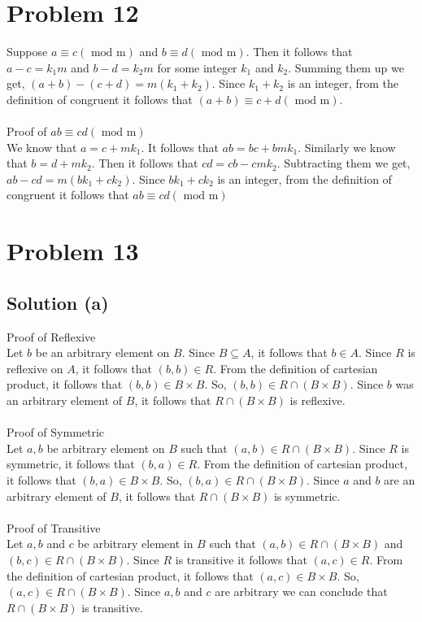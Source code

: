 \documentclass{article}
\begin{document}
\section{Problem 12}
Suppose $a \equiv c (\text{ mod m})$ and $b \equiv d (\text{ mod m})$. Then it follows
that $a - c = k_1m$ and $b - d = k_2m$ for some integer $k_1$ and
$k_2$. Summing them up we get, $(a + b) - (c + d) = m(k_1 + k_2)$.
Since $k_1 + k_2$ is an integer, from the definition of congruent it
follows that $(a + b) \equiv c + d (\text{ mod m})$. \\ \\
Proof of $ab \equiv cd (\text{ mod m})$ \\
We know that $ a = c + mk_1$. It follows that $ab = bc + bmk_1$.
Similarly we know that $b = d + mk_2$. Then it follows that $cd = cb -
cmk_2$. Subtracting them we get, $ab - cd = m(bk_1 + ck_2)$. Since
$bk_1 + ck_2$ is an integer, from the definition of congruent it
follows that $ab \equiv cd (\text{ mod m})$

\section{Problem 13}
\subsection{Solution (a)}
Proof of Reflexive \\ 
Let $b$ be an arbitrary element on $B$. Since $B \subseteq A$, it
follows that $b \in A$. Since $R$ is reflexive on $A$, it follows that
$(b,b) \in R$. From the definition of cartesian product, it follows
that $(b,b) \in B \times B$. So, $(b,b) \in R \cap (B \times B)$.
Since $b$ was an arbitrary element of $B$, it follows that
$R \cap (B \times B)$ is reflexive. \\ \\
Proof of Symmetric \\ 
Let $a,b$ be arbitrary element on $B$ such that
$(a,b) \in R \cap (B \times B)$. Since $R$ is symmetric, it follows
that $(b,a) \in R$. From the definition of cartesian product, it
follows that $(b,a) \in B \times B$. So,
$(b,a) \in R \cap (B \times B)$. Since $a$ and $b$ are an arbitrary
element of $B$, it follows that $R \cap (B \times B)$ is symmetric. \\\\
Proof of Transitive \\ 
Let $a,b$ and $c$ be arbitrary element in $B$ such that $(a,b) \in R
\cap (B \times B)$ and $(b,c) \in R \cap (B \times B)$. Since $R$ is
transitive it follows that $(a,c) \in R$. From the definition of
cartesian product, it follows that $(a,c) \in B \times B$. So, $(a,c)
\in R \cap (B \times B)$. Since $a,b$ and $c$ are arbitrary we can
conclude that $R \cap (B \times B)$ is transitive.
\end{document}
